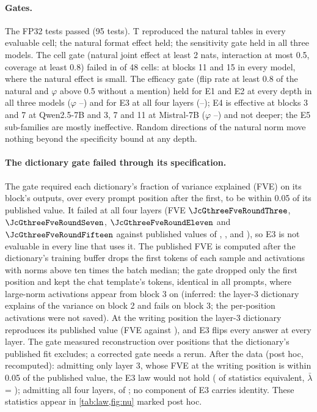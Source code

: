 \paragraph{Gates.} The FP32 tests passed (95 tests). T reproduced the natural tables in every evaluable cell; the natural format effect held; the sensitivity gate held in all three models. The cell gate (natural joint effect at least 2 nats, interaction at most 0.5, coverage at least 0.8) failed in \JcGfourFail{} of 48 cells: \fmtLetter{} at blocks 11 and 15 in every model, where the natural effect is small. The efficacy gate (flip rate at least 0.8 of the natural and $\varphi$ above 0.5 without a mention) held for E1 and E2 at every depth in all three models ($\varphi$ \JcGfivePhiNearMin{}--\JcGfivePhiNearMax{}) and for E3 at all four layers (\JcGfivePhiEthreeMin{}--\JcGfivePhiEthreeMax{}); E4 is effective at blocks 3 and 7 at Qwen2.5-7B and 3, 7 and 11 at Mistral-7B ($\varphi$ \JcGfivePhiEfourEffMin{}--\JcGfivePhiEfourEffMax{}) and not deeper; the E5 sub-families are mostly ineffective. Random directions of the natural norm move nothing beyond the specificity bound at any depth. %

\paragraph{The dictionary gate failed through its specification.} The gate required each dictionary's fraction of variance explained (FVE) on its block's outputs, over every prompt position after the first, to be within 0.05 of its published value. It failed at all four layers (FVE $\JcGthreeFveRoundThree$, $\JcGthreeFveRoundSeven$, $\JcGthreeFveRoundEleven$ and $\JcGthreeFveRoundFifteen$ against published values of \JcGthreePubRoundThree{}, \JcGthreePubRoundSeven{}, \JcGthreePubRoundEleven{} and \JcGthreePubRoundFifteen{}), so E3 is not evaluable in every line that uses it. The published FVE is computed after the dictionary's training buffer drops the first tokens of each sample and activations with norms above ten times the batch median; the gate dropped only the first position and kept the chat template's tokens, identical in all prompts, where large-norm activations appear from block 3 on (inferred: the layer-3 dictionary explains \JcGthreeFvePrevThree{} of the variance on block 2 and fails on block 3; the per-position activations were not saved). At the writing position the layer-3 dictionary reproduces its published value (FVE \JcGthreeFvePThree{} against \JcGthreePubRoundThree{}), and E3 flips every answer at every layer. The gate measured reconstruction over positions that the dictionary's published fit excludes; a corrected gate needs a rerun. After the data (post hoc, recomputed): admitting only layer 3, whose FVE at the writing position is within 0.05 of the published value, the E3 law would not hold (\JcThreePosthocLayerThreeNeq{} of \JcThreePosthocLayerThreeNstat{} statistics equivalent, $\bar\lambda$ = \JcThreePosthocLayerThreePool{}); admitting all four layers, \JcThreePosthocAllNeq{} of \JcThreePosthocAllNstat{}; no component of E3 carries identity. These statistics appear in \cref{tab:law,fig:nu} marked post hoc. %

